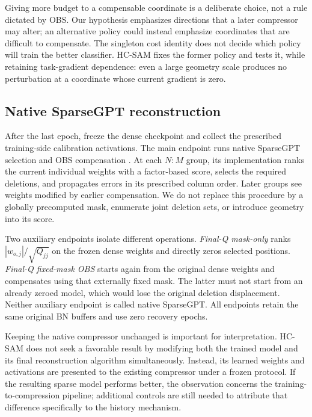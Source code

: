 Giving more budget to a compensable coordinate is a deliberate choice, not a rule dictated by OBS. Our hypothesis emphasizes directions that a later compressor may alter; an alternative policy could instead emphasize coordinates that are difficult to compensate. The singleton cost identity does not decide which policy will train the better classifier. HC-SAM fixes the former policy and tests it, while retaining task-gradient dependence: even a large geometry scale produces no perturbation at a coordinate whose current gradient is zero.

\subsection{Native SparseGPT reconstruction}
After the last epoch, freeze the dense checkpoint and collect the prescribed training-side calibration activations. The main endpoint runs native SparseGPT selection and OBS compensation \cite{sparsegpt}. At each $N{:}M$ group, its implementation ranks the current individual weights with a factor-based score, selects the required deletions, and propagates errors in its prescribed column order. Later groups see weights modified by earlier compensation. We do not replace this procedure by a globally precomputed mask, enumerate joint deletion sets, or introduce geometry into its score.

Two auxiliary endpoints isolate different operations. \emph{Final-Q mask-only} ranks $|w_{o,j}|/\sqrt{Q_{jj}}$ on the frozen dense weights and directly zeros selected positions. \emph{Final-Q fixed-mask OBS} starts again from the original dense weights and compensates using that externally fixed mask. The latter must not start from an already zeroed model, which would lose the original deletion displacement. Neither auxiliary endpoint is called native SparseGPT. All endpoints retain the same original BN buffers and use zero recovery epochs.

Keeping the native compressor unchanged is important for interpretation. HC-SAM does not seek a favorable result by modifying both the trained model and its final reconstruction algorithm simultaneously. Instead, its learned weights and activations are presented to the existing compressor under a frozen protocol. If the resulting sparse model performs better, the observation concerns the training-to-compression pipeline; additional controls are still needed to attribute that difference specifically to the history mechanism.

